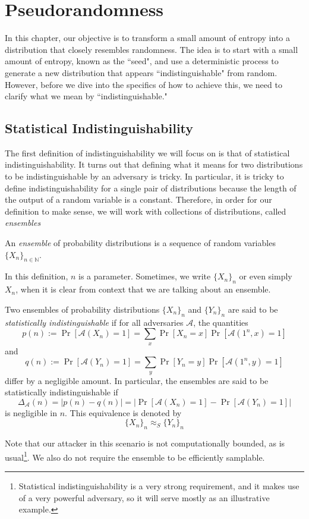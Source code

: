 \documentclass[12pt]{tufte-book}
\newcommand{\ma}{\mathcal{A}}
\begin{document}
 \chapter{Pseudorandomness}
In this chapter, our objective is to transform a small amount of entropy into a distribution that closely resembles randomness.
The idea is to start with a small amount of entropy, known as the ``seed", and use a deterministic process to generate a new distribution that appears ``indistinguishable" from random. 
However, before we dive into the specifics of how to achieve this, we need to clarify what we mean by ``indistinguishable."

\section{Statistical Indistinguishability}
The first definition of indistinguishability we will focus on is that of statistical indistinguishability.
It turns out that defining what it means for two distributions to be indistinguishable by an adversary is tricky.
In particular, it is tricky to define indistinguishability for a single pair of distributions because the length of the output of a random variable is a constant.
Therefore, in order for our definition to make sense, we will work with collections of distributions, called \emph{ensembles}
\begin{definition}
An \emph{ensemble} of probability distributions is a sequence of random variables $\{X_n\}_{n\in \mathbb{N}}$. 
\end{definition}
In this definition, $n$ is a parameter.
Sometimes, we write $\{X_n\}_n$ or even simply $X_n$, when it is clear from context that we are talking about an ensemble.

\begin{definition}
    Two ensembles of probability distributions $\{X_n\}_n$ and $\{Y_n\}_n$ are said to be \emph{statistically indistinguishable} if for all adversaries $\ma$, the quantities
    $$p(n) := \Pr[\ma(X_n) = 1] = \sum_x \Pr[X_n = x]\Pr[\ma(1^n,x) = 1]$$
    and
    $$q(n) := \Pr[\ma(Y_n) = 1] = \sum_y \Pr[Y_n = y]\Pr[\ma(1^n,y) = 1]$$
    differ by a negligible amount.
    In particular, the ensembles are said to be statistically indistinguishable if
    $$\Delta_\ma(n) = |p(n) - q(n)| = |\Pr[\ma(X_n) = 1] - \Pr[\ma(Y_n) = 1]|$$
    is negligible in $n$.
This equivalence is denoted by
$$\{X_n\}_n \approx_S \{Y_n\}_n$$
\end{definition}
Note that our attacker in this scenario is not computationally bounded, as is usual\footnote{Statistical indistinguishability is a very strong requirement, and it makes use of a very powerful adversary, so it will serve mostly as an illustrative example.}.
We also do not require the ensemble to be efficiently samplable.
\end{document}
